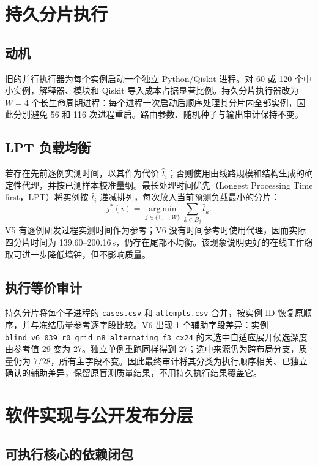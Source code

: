 \documentclass[11pt,a4paper]{article}
\newcommand{\argmin}{\operatorname*{arg\,min}}
\begin{document}
\section{持久分片执行}

\subsection{动机}

旧的并行执行器为每个实例启动一个独立 Python/Qiskit 进程。对 60 或 120 个中小实例，解释器、模块和 Qiskit 导入成本占据显著比例。持久分片执行器改为 $W=4$ 个长生命周期进程：每个进程一次启动后顺序处理其分片内全部实例，因此分别避免 56 和 116 次进程重启。路由参数、随机种子与输出审计保持不变。

\subsection{LPT 负载均衡}

若存在先前逐例实测时间，以其作为代价 $\hat t_i$；否则使用由线路规模和结构生成的确定性代理，并按已测样本校准量纲。最长处理时间优先（Longest Processing Time first，LPT）将实例按 $\hat t_i$ 递减排列，每次放入当前预测负载最小的分片：
\begin{equation}
  j^*(i)=\argmin_{j\in\{1,\ldots,W\}}
  \sum_{k\in B_j}\hat t_k.
\end{equation}
V5 有逐例研发过程实测时间作为参考；V6 没有时间参考时使用代理，因而实际四分片时间为 139.60--200.16\,s，仍存在尾部不均衡。该现象说明更好的在线工作窃取可进一步降低墙钟，但不影响质量。

\subsection{执行等价审计}

持久分片将每个子进程的 \texttt{cases.csv} 和 \texttt{attempts.csv} 合并，按实例 ID 恢复原顺序，并与冻结质量参考逐字段比较。V6 出现 1 个辅助字段差异：实例
\texttt{blind\_v6\_039\_r0\_grid\_n8\_alternating\_f3\_cx24}
的未选中自适应展开候选深度由参考值 29 变为 27。独立单例重跑同样得到 27；选中来源仍为跨布局分支，质量仍为 $7/28$，所有主字段不变。因此最终审计将其分类为执行顺序相关、已独立确认的辅助差异，保留原盲测质量结果，不用持久执行结果覆盖它。

\section{软件实现与公开发布分层}

\subsection{可执行核心的依赖闭包}
\end{document}
